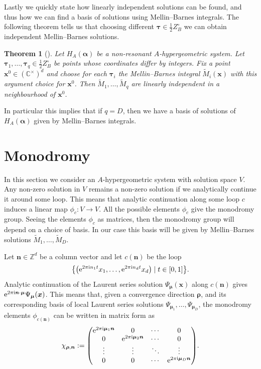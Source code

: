 \documentclass[pdftex]{sigma}
\numberwithin{equation}{section}
\newtheorem{Theorem}{Theorem}[section]
\begin{document}
Lastly we quickly state how linearly independent solutions can be found, and thus how we can find a basis of solutions using Mellin--Barnes integrals. The following theorem tells us that choosing different $\bm\tau\in\frac12 Z_B^\circ$ we can obtain independent Mellin--Barnes solutions.

\begin{Theorem}[{\cite[Proposition 4.6]{Beu13}}] %
Let $H_A(\bm{\alpha})$ be a non-resonant $A$-hypergeometric system. Let
$\bm{\tau}_1,\dots,\bm{\tau}_q \in \frac{1}{2}Z_B^{\circ}$ be points whose coordinates
differ by integers. Fix a point $\bm{x}^0\in(\mathbb{C}^\times)^d$
and choose for each $\bm\tau_i$ the
Mellin--Barnes integral $\tilde{M}_i(\bm{x})$ with this argument choice for $\bm{x}^0$.
Then $\tilde{M}_1,\dots,\tilde{M}_q$ are linearly independent in a neighbourhood of $\bm{x}^0$.
\end{Theorem}
In particular this implies that if $q=D$, then we have a basis of solutions of
$H_A(\bm\alpha)$ given by Mellin--Barnes integrals.

\section{Monodromy}
\label{chap-mon}
In this section we consider an $A$-hypergeometric system with solution space $V$. Any non-zero solution in $V$ remains a non-zero solution if we analytically continue it around some loop.
This means that analytic continuation along some loop $c$ induces a linear map
$\phi_{c}\colon V \rightarrow V$.
All the possible elements $\phi_{c}$ give the monodromy group.
Seeing the elements $\phi_{c}$ as matrices, then the monodromy group will depend on a choice of basis. In our case this basis will be given by Mellin--Barnes solutions $\tilde{M}_1,\dots,\tilde{M}_D$.

Let $\bm{n} \in \mathbb{Z}^d$ be a column vector and let $c(\bm{n})$ be the loop
\begin{gather*}
\big\{\big({\rm e}^{2\pi {\rm i} n_1 t}x_1,\dots,{\rm e}^{2\pi {\rm i} n_d t}x_d\big)\mid t \in [0,1]\big\}.
\end{gather*}
Analytic
continuation of the Laurent series solution $\Psi_{\bm{\mu}}(\bm{x})$ along $c(\bm{n})$
gives ${\rm e}^{2\pi {\rm i} \bm{n} \cdot \bm\mu}\Psi_{\bm\mu}(\bm{x})$. This means that, given a convergence direction $\bm\rho$, and its corresponding basis of local Laurent series solutions
$\Psi_{\bm\mu_1},\dots,\Psi_{\bm\mu_D}$, the monodromy elements $\phi_{c(\bm{n})}$ can be written in matrix form as
\begin{gather*}
\chi_{\bm\rho,\bm{n}} := \begin{pmatrix}{\rm e}^{2\pi {\rm i} \bm\mu_1 \bm{n}} & 0 & \cdots & 0 \\ 0 & {\rm e}^{2\pi {\rm i} \bm\mu_2 \bm{n}} & \cdots & 0 \\ \vdots & \vdots & \ddots & \vdots \\ 0 & 0 & \cdots & {\rm e}^{2\pi {\rm i} \bm\mu_D \bm{n}}\end{pmatrix}\!.
\end{gather*}
\end{document}
